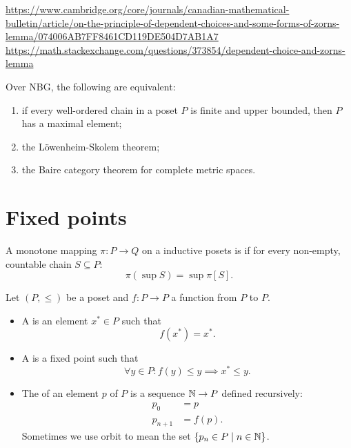 \url{https://www.cambridge.org/core/journals/canadian-mathematical-bulletin/article/on-the-principle-of-dependent-choices-and-some-forms-of-zorns-lemma/074006AB7FF8461CD119DE504D7AB1A7}
\url{https://math.stackexchange.com/questions/373854/dependent-choice-and-zorns-lemma}

\begin{proposition}
Over NBG, the following are equivalent:
\begin{enumerate}
\item if every well-ordered chain in a poset $P$ is finite and upper bounded, then $P$ has a maximal element;
\item the Löwenheim-Skolem theorem;
\item the Baire category theorem for complete metric spaces.
\end{enumerate}
\end{proposition}




\chapter{Fixed points}

\begin{definition}
A monotone mapping $\pi : P \to Q$ on a inductive posets
 is  if for every non-empty, countable chain $S\subseteq P$:
 \[ \pi(\sup S) = \sup\pi[S]. \]
\end{definition}

\begin{definition}
Let $(P,\leq)$ be a poset and $f: P\to P$ a function from $P$ to $P$.
\begin{itemize}
\item A  is an element $x^*\in P$ such that
\[ f(x^*) = x^*. \]
\item A  is a fixed point such that
\[ \forall y\in P: f(y)\leq y \implies x^* \leq y. \]
\item The  of an element $p$ of $P$ is a sequence $\mathbb{N}\to P$ defined recursively:
\begin{align*}
p_0 &= p \\
p_{n+1} &= f(p).
\end{align*}
Sometimes we use orbit to mean the set $\{p_n\in P\;|\; n\in \mathbb{N}\}$.
\end{itemize}
\end{definition}

